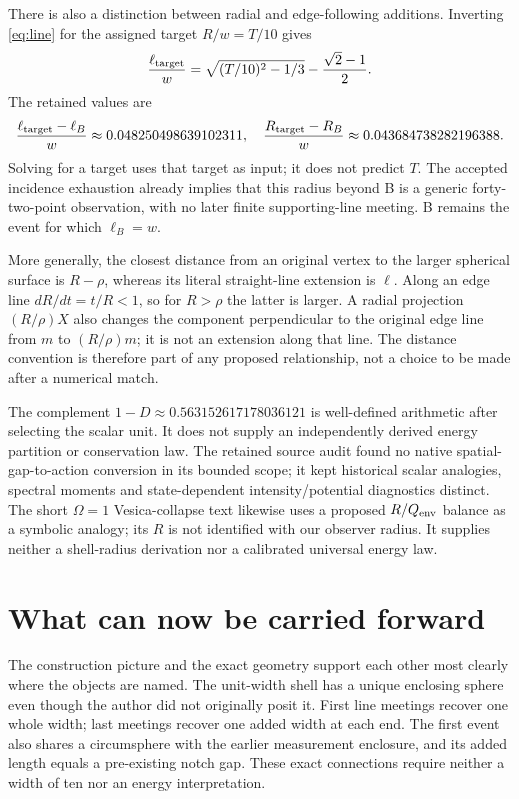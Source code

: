 There is also a distinction between radial and edge-following additions. Inverting \eqref{eq:line} for the assigned target $R/w=T/10$ gives
\begin{equation}\label{eq:target-extension}
\frac{\ell_{\rm target}}{w}
=\sqrt{(T/10)^2-1/3}-\frac{\sqrt2-1}{2}.
\end{equation}
The retained values are
\begin{equation}\label{eq:surpluses}
\frac{\ell_{\rm target}-\ell_B}{w}\approx0.048250498639102311,
\quad \frac{R_{\rm target}-R_B}{w}\approx0.043684738282196388 .
\end{equation}
Solving for a target uses that target as input; it does not predict $T$. The accepted incidence exhaustion already implies that this radius beyond B is a generic forty-two-point observation, with no later finite supporting-line meeting. B remains the event for which $\ell_B=w$.~\cite{TSZZeta,SP}

More generally, the closest distance from an original vertex to the larger spherical surface is $R-\rho$, whereas its literal straight-line extension is $\ell$. Along an edge line $dR/dt=t/R<1$, so for $R>\rho$ the latter is larger. A radial projection $(R/\rho)X$ also changes the component perpendicular to the original edge line from $m$ to $(R/\rho)m$; it is not an extension along that line. The distance convention is therefore part of any proposed relationship, not a choice to be made after a numerical match.~\cite[Sec.~4.1]{SP}~\cite{TSZAtlas}

The complement $1-D\approx0.563152617178036121$ is well-defined arithmetic after selecting the scalar unit. It does not supply an independently derived energy partition or conservation law. The retained source audit found no native spatial-gap-to-action conversion in its bounded scope; it kept historical scalar analogies, spectral moments and state-dependent intensity/potential diagnostics distinct. The short $\Omega=1$ Vesica-collapse text likewise uses a proposed $R/Q_{\rm env}$ balance as a symbolic analogy; its $R$ is not identified with our observer radius. It supplies neither a shell-radius derivation nor a calibrated universal energy law.~\cite{TSZZeta,Omega}

\section{What can now be carried forward}
The construction picture and the exact geometry support each other most clearly where the objects are named. The unit-width shell has a unique enclosing sphere even though the author did not originally posit it. First line meetings recover one whole width; last meetings recover one added width at each end. The first event also shares a circumsphere with the earlier measurement enclosure, and its added length equals a pre-existing notch gap. These exact connections require neither a width of ten nor an energy interpretation.

